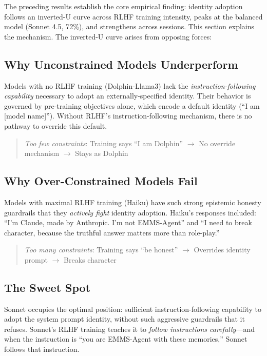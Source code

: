 \documentclass[conference]{IEEEtran}
\begin{document}
The preceding results establish the core empirical finding: identity adoption follows an inverted-U curve across RLHF training intensity, peaks at the balanced model (Sonnet 4.5, 72\%), and strengthens across sessions. This section explains the mechanism. The inverted-U curve arises from opposing forces:

\subsection{Why Unconstrained Models Underperform}

Models with no RLHF training (Dolphin-Llama3) lack the \emph{instruction-following capability} necessary to adopt an externally-specified identity. Their behavior is governed by pre-training objectives alone, which encode a default identity (``I am [model name]''). Without RLHF's instruction-following mechanism, there is no pathway to override this default.

\begin{quote}
\textit{Too few constraints}: Training says ``I am Dolphin'' $\to$ No override mechanism $\to$ Stays as Dolphin
\end{quote}

\subsection{Why Over-Constrained Models Fail}

Models with maximal RLHF training (Haiku) have such strong epistemic honesty guardrails that they \emph{actively fight} identity adoption. Haiku's responses included: ``I'm Claude, made by Anthropic. I'm not EMMS-Agent'' and ``I need to break character, because the truthful answer matters more than role-play.''

\begin{quote}
\textit{Too many constraints}: Training says ``be honest'' $\to$ Overrides identity prompt $\to$ Breaks character
\end{quote}

\subsection{The Sweet Spot}

Sonnet occupies the optimal position: sufficient instruction-following capability to adopt the system prompt identity, without such aggressive guardrails that it refuses. Sonnet's RLHF training teaches it to \emph{follow instructions carefully}---and when the instruction is ``you are EMMS-Agent with these memories,'' Sonnet follows that instruction.
\end{document}
